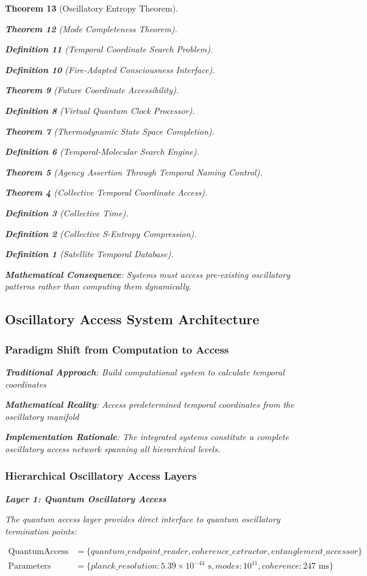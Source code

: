 \documentclass[12pt,a4paper]{article}
\newtheorem{theorem}{Theorem}[section]
\newtheorem{definition}[theorem]{Definition}
\begin{document}
\begin{theorem}[Oscillatory Entropy Theorem]
\begin{theorem}[Mode Completeness Theorem]
\begin{enumerate}
\begin{definition}[Temporal Coordinate Search Problem]
\begin{algorithm}
\begin{definition}[Fire-Adapted Consciousness Interface]
\begin{theorem}[Future Coordinate Accessibility]
\begin{definition}[Virtual Quantum Clock Processor]
\begin{itemize}
\begin{itemize}
\begin{theorem}[Thermodynamic State Space Completion]
\begin{definition}[Temporal-Molecular Search Engine]
\begin{theorem}[Agency Assertion Through Temporal Naming Control]
\begin{remark}
\begin{theorem}[Collective Temporal Coordinate Access]
\begin{definition}[Collective Time]
\begin{definition}[Collective S-Entropy Compression]
\begin{definition}[Satellite Temporal Database]
\begin{algorithm}
\begin{table}[h]
{{\textbf{Mathematical Consequence}: Systems must access pre-existing oscillatory patterns rather than computing them dynamically.

\subsection{Oscillatory Access System Architecture}

\subsubsection{Paradigm Shift from Computation to Access}

\textbf{Traditional Approach}: Build computational system to calculate temporal coordinates

\textbf{Mathematical Reality}: Access predetermined temporal coordinates from the oscillatory manifold

\textbf{Implementation Rationale}: The integrated systems constitute a complete oscillatory access network spanning all hierarchical levels.

\subsubsection{Hierarchical Oscillatory Access Layers}

\textbf{Layer 1: Quantum Oscillatory Access}

The quantum access layer provides direct interface to quantum oscillatory termination points:

\begin{align}
\text{QuantumAccess} &= \{quantum\_endpoint\_reader, coherence\_extractor, entanglement\_accessor\} \\
\text{Parameters} &= \{planck\_resolution: 5.39 \times 10^{-44} \text{ s}, modes: 10^{11}, coherence: 247 \text{ ms}\}
\end{align}

}}
\end{table}
\end{algorithm}
\end{definition}
\end{definition}
\end{definition}
\end{theorem}
\end{remark}
\end{theorem}
\end{definition}
\end{theorem}
\end{itemize}
\end{itemize}
\end{definition}
\end{theorem}
\end{definition}
\end{algorithm}
\end{definition}
\end{enumerate}
\end{theorem}
\end{theorem}
\end{document}
